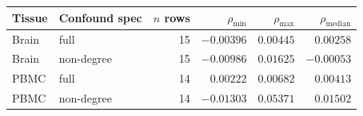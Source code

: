 \begin{tabular}{llrrrr}
\toprule
Tissue & Confound spec & $n$ rows & $\rho_{\min}$ & $\rho_{\max}$ & $\rho_{\mathrm{median}}$ \\ 
\midrule
Brain & full & 15 & $-0.00396$ & $0.00445$ & $0.00258$ \\
Brain & non-degree & 15 & $-0.00986$ & $0.01625$ & $-0.00053$ \\
PBMC & full & 14 & $0.00222$ & $0.00682$ & $0.00413$ \\
PBMC & non-degree & 14 & $-0.01303$ & $0.05371$ & $0.01502$ \\
\bottomrule
\end{tabular}
